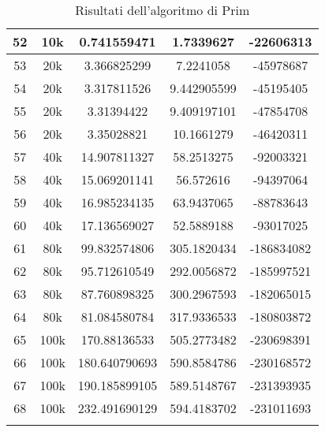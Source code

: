 \begin{center}
\begin{longtable}{|c|c|c|c|c|}
52 & 10k & 0.741559471 & 1.7339627 & -22606313\\
\hline
53 & 20k & 3.366825299 & 7.2241058 & -45978687\\
54 & 20k & 3.317811526 & 9.442905599 & -45195405\\
55 & 20k & 3.31394422 & 9.409197101 & -47854708\\
56 & 20k & 3.35028821 & 10.1661279 & -46420311\\
\hline
57 & 40k & 14.907811327 & 58.2513275 & -92003321\\
58 & 40k & 15.069201141 & 56.572616 & -94397064\\
59 & 40k & 16.985234135 & 63.9437065 & -88783643\\
60 & 40k & 17.136569027 & 52.5889188 & -93017025\\
\hline
61 & 80k & 99.832574806 & 305.1820434 & -186834082\\
62 & 80k & 95.712610549 & 292.0056872 & -185997521\\
63 & 80k & 87.760898325 & 300.2967593 & -182065015\\
64 & 80k & 81.084580784 & 317.9336533 & -180803872\\
\hline
65 & 100k & 170.88136533 & 505.2773482 & -230698391\\
66 & 100k & 180.640790693 & 590.8584786 & -230168572\\
67 & 100k & 190.185899105 & 589.5148767 & -231393935\\
68 & 100k & 232.491690129 & 594.4183702 & -231011693\\ \hline
		\caption{Risultati dell'algoritmo di Prim} \\
	\end{longtable}
\end{center}


